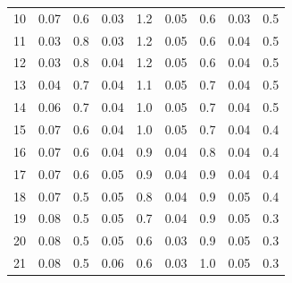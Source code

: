 \documentclass[a4paper]{article}
\begin{document}
\begin{table}[H]
\begin{tabular}{c|cc||cc||cc||cc}
		10 & 0.07                         & 0.6                            & 0.03                         & 1.2                        & 0.05      & 0.6        & 0.03      & 0.5        \\
		11 & 0.03                         & 0.8                            & 0.03                         & 1.2                        & 0.05      & 0.6        & 0.04      & 0.5        \\
		12 & 0.03                         & 0.8                            & 0.04                         & 1.2                        & 0.05      & 0.6        & 0.04      & 0.5        \\
		13 & 0.04                         & 0.7                            & 0.04                         & 1.1                        & 0.05      & 0.7        & 0.04      & 0.5        \\
		14 & 0.06                         & 0.7                            & 0.04                         & 1.0                        & 0.05      & 0.7        & 0.04      & 0.5        \\
		15 & 0.07                         & 0.6                            & 0.04                         & 1.0                        & 0.05      & 0.7        & 0.04      & 0.4        \\
		16 & 0.07                         & 0.6                            & 0.04                         & 0.9                        & 0.04      & 0.8        & 0.04      & 0.4        \\
		17 & 0.07                         & 0.6                            & 0.05                         & 0.9                        & 0.04      & 0.9        & 0.04      & 0.4        \\
		18 & 0.07                         & 0.5                            & 0.05                         & 0.8                        & 0.04      & 0.9        & 0.05      & 0.4        \\
		19 & 0.08                         & 0.5                            & 0.05                         & 0.7                        & 0.04      & 0.9        & 0.05      & 0.3        \\
		20 & 0.08                         & 0.5                            & 0.05                         & 0.6                        & 0.03      & 0.9        & 0.05      & 0.3        \\
		21 & 0.08                         & 0.5                            & 0.06                         & 0.6                        & 0.03      & 1.0        & 0.05      & 0.3        \\

\end{tabular}
\end{table}
\end{document}
